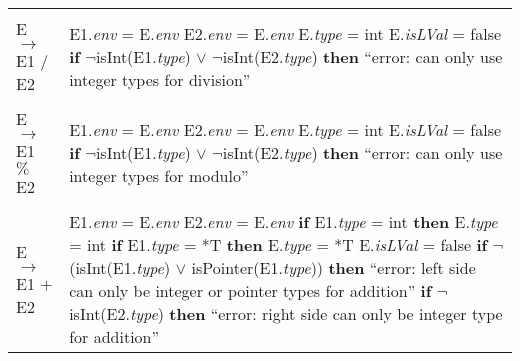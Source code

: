 \documentclass{article}
\begin{document}
\begin{center}
\begin{longtable}{ |l|l| }
     & \\
    
    E $\rightarrow$ E1 / E2 & \makecell[l]{E1.\textit{env} = E.\textit{env} \\ E2.\textit{env} = E.\textit{env} \\ E.\textit{type} = int \\ E.\textit{isLVal} = false \\ \textbf{if} $\neg$isInt(E1.\textit{type}) $\lor$ $\neg$isInt(E2.\textit{type}) \\ \textbf{then} ``error: can only use integer types for \\ division''} \\
    
     & \\
    
    E $\rightarrow$ E1 $\%$ E2 & \makecell[l]{E1.\textit{env} = E.\textit{env} \\ E2.\textit{env} = E.\textit{env} \\ E.\textit{type} = int \\ E.\textit{isLVal} = false \\ \textbf{if} $\neg$isInt(E1.\textit{type}) $\lor$ $\neg$isInt(E2.\textit{type}) \\ \textbf{then} ``error: can only use integer types for modulo''} \\
    
     & \\
    
    E $\rightarrow$ E1 + E2 & \makecell[l]{E1.\textit{env} = E.\textit{env} \\ E2.\textit{env} = E.\textit{env} \\ \textbf{if} E1.\textit{type} = int \textbf{then} E.\textit{type} = int \\ \textbf{if} E1.\textit{type} = *T \textbf{then} E.\textit{type} = *T \\ E.\textit{isLVal} = false \\ \textbf{if} $\neg$(isInt(E1.\textit{type}) $\lor$ isPointer(E1.\textit{type})) \\ \textbf{then} ``error: left side can only be integer or pointer types \\ for addition'' \\ \textbf{if} $\neg$isInt(E2.\textit{type}) \\ \textbf{then} ``error: right side can only be integer type for \\ addition''} \\
    

\end{longtable}
\end{center}
\end{document}
